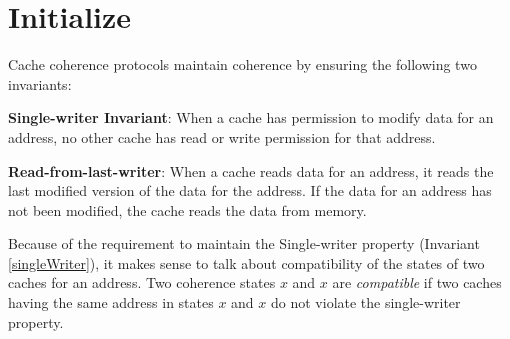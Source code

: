 \section{Initialize}
\label{sec:init}

Cache coherence protocols maintain coherence by ensuring the following two
invariants:

\begin{inv}
\textbf{Single-writer Invariant}: When a cache has permission to modify data for
an address, no other cache has read or write permission for that
address.
\label{singleWriter}
\end{inv}

\begin{inv}
\textbf{Read-from-last-writer}: When a cache reads data for an address, it reads
the last modified version of the data for the address. If the data for an
address has not been modified, the cache reads the data from memory.
\label{lastRead}
\end{inv}

Because of the requirement to maintain the Single-writer property (Invariant
\ref{singleWriter}), it makes sense to talk about compatibility of the states of
two caches for an address. Two coherence states $x$ and $x$ are \emph{compatible}
if two caches having the same address in states $x$ and $x$ do not violate the
single-writer property.


